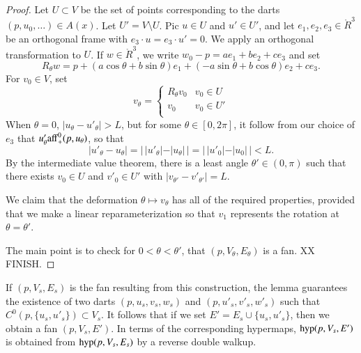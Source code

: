 \begin{proof}
Let $U\subset V$ be the set of points corresponding
to the darts $(p,u_0,\ldots)\in A(x)$.  Let $U'=V\setminus U$.
Pic $u\in U$ and $u'\in U'$, and let $e_1,e_2,e_3\in\ring{R}^3$ be 
an orthogonal frame with $e_3\cdot u = e_3\cdot u' = 0$.
We apply an orthogonal transformation to $U$.
If $w\in\ring{R}^3$, we write
$w_0-p = a e_1 + b e_2 + c e_3$ and set
$$R_\theta w = p + (a\cos\theta+b\sin\theta) e_1 +
   (-a\sin\theta+b\cos\theta) e_2 + c e_3.$$
For $v_0\in V$, set
  $$
  v_\theta = \begin{cases}
    R_\theta v_0 & v_0\in U\\
    v_0 & v_0\in U'\\
    \end{cases}
  $$
When $\theta=0$, $|u_\theta-u'_\theta|>L$, but for some $\theta\in[0,2\pi]$,
it follow from our choice of $e_3$ that
$u'_\theta{\operatorname{aff}}_+^0(p,u_\theta)$, so that
$$|u'_\theta - u_\theta| = |\,|u'_\theta| - |u_\theta|\,|
  = |\,|u'_0| - |u_0|\,| < L.$$
By the intermediate value theorem, there is a least angle
$\theta'\in(0,\pi)$ such that there exists $v_0\in U$
and $v'_0\in U'$ with $|v_{\theta'}-v'_{\theta'}|=L$.

We claim that the deformation $\theta\mapsto v_\theta$
has all of the required properties, provided that we make
a linear reparameterization so that $v_1$ represents the
rotation at $\theta=\theta'$.

The main point is to check for $0 < \theta < \theta'$,
that $(p,V_\theta,E_\theta)$ is a fan.
XX FINISH.
\end{proof}

If $(p,V_s,E_s)$ is the fan resulting from
this construction, the lemma guarantees the existence
of two darts $(p,u_s,v_s,w_s)$ and $(p,u'_s,v'_s,w'_s)$
such that $C^0(p,\{u_s,u'_s\})\subset V_s$.  It follows
that if we set $E' = E_s \cup \{u_s,u'_s\}$, then we obtain
a fan $(p,V_s,E')$.  In terms of the 
corresponding hypermaps, ${\operatorname{hyp}}(p,V_s,E')$ is obtained from
${\operatorname{hyp}}(p,V_s,E_s)$ by a reverse double walkup.

